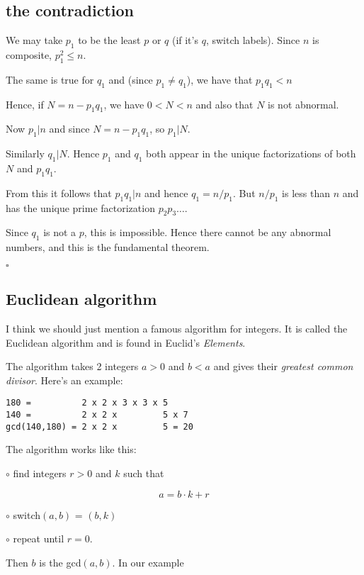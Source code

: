 \documentclass[11pt, oneside]{article}
\begin{document}
\subsection*{the contradiction}

We may take $p_1$ to be the least $p$ or $q$ (if it's $q$, switch labels).  Since $n$ is composite, $p_1^2 \le n$.

The same is true for $q_1$ and (since $p_1 \ne q_1$), we have that $p_1 q_1 < n$

Hence, if $N = n - p_1 q_1$, we have $0 < N < n$ and also that $N$ is not abnormal.

Now $p_1 | n$ and since $N = n - p_1 q_1$, so $p_1 | N$.

Similarly $q_1 | N$.  Hence $p_1$ and $q_1$ both appear in the unique factorizations of both $N$ and $p_1 q_1$.

From this it follows that $p_1 q_1 | n$ and hence $q_1 = n/p_1$.  But $n/p_1$ is less than $n$ and has the unique prime factorization $p_2 p_3 \dots$.

Since $q_1$ is not a $p$, this is impossible.  Hence there cannot be any abnormal numbers, and this is the fundamental theorem.

$\square$

\subsection*{Euclidean algorithm}

 I think we should just mention a famous algorithm for integers.  It is called the Euclidean algorithm and is found in Euclid's \emph{Elements}.

The algorithm takes 2 integers $a > 0$ and $b < a$ and gives their \emph{greatest common divisor}.  Here's an example:

\begin{verbatim}
180 =          2 x 2 x 3 x 3 x 5
140 =          2 x 2 x         5 x 7
gcd(140,180) = 2 x 2 x         5 = 20
\end{verbatim}

The algorithm works like this:

$\circ$ find integers $r > 0$ and $k$ such that

\[ a = b \cdot k + r \]

$ \circ$ switch$(a,b)$ = $(b,k)$

$ \circ$ repeat until $r = 0$.  

Then $b$ is the gcd$(a,b)$.  In our example
\end{document}
